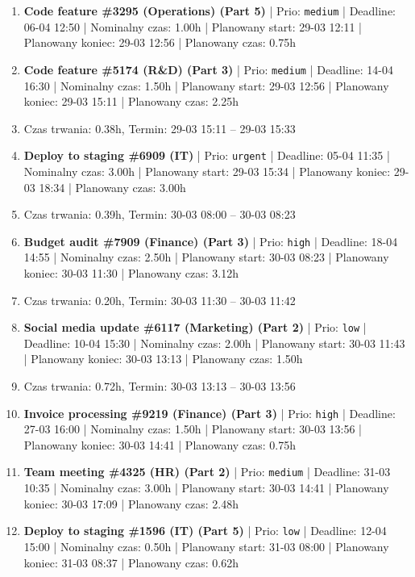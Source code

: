 {\begin{enumerate}
  \item [\textbf{14645}] \textbf{Code feature \#3295 (Operations) (Part 5)} | Prio: \texttt{medium} | Deadline: 06-04 12:50 | Nominalny czas: 1.00h | Planowany start: 29-03 12:11 | Planowany koniec: 29-03 12:56 | Planowany czas: 0.75h
  \item [\textbf{14646}] \textbf{Code feature \#5174 (R\&D) (Part 3)} | Prio: \texttt{medium} | Deadline: 14-04 16:30 | Nominalny czas: 1.50h | Planowany start: 29-03 12:56 | Planowany koniec: 29-03 15:11 | Planowany czas: 2.25h
  \item [\textbf{PRZERWA}] Czas trwania: 0.38h, Termin: 29-03 15:11 -- 29-03 15:33
  \item [\textbf{14597}] \textbf{Deploy to staging \#6909 (IT)} | Prio: \texttt{urgent} | Deadline: 05-04 11:35 | Nominalny czas: 3.00h | Planowany start: 29-03 15:34 | Planowany koniec: 29-03 18:34 | Planowany czas: 3.00h
  \item [\textbf{PRZERWA}] Czas trwania: 0.39h, Termin: 30-03 08:00 -- 30-03 08:23
  \item [\textbf{14616}] \textbf{Budget audit \#7909 (Finance) (Part 3)} | Prio: \texttt{high} | Deadline: 18-04 14:55 | Nominalny czas: 2.50h | Planowany start: 30-03 08:23 | Planowany koniec: 30-03 11:30 | Planowany czas: 3.12h
  \item [\textbf{PRZERWA}] Czas trwania: 0.20h, Termin: 30-03 11:30 -- 30-03 11:42
  \item [\textbf{14700}] \textbf{Social media update \#6117 (Marketing) (Part 2)} | Prio: \texttt{low} | Deadline: 10-04 15:30 | Nominalny czas: 2.00h | Planowany start: 30-03 11:43 | Planowany koniec: 30-03 13:13 | Planowany czas: 1.50h
  \item [\textbf{PRZERWA}] Czas trwania: 0.72h, Termin: 30-03 13:13 -- 30-03 13:56
  \item [\textbf{14622}] \textbf{Invoice processing \#9219 (Finance) (Part 3)} | Prio: \texttt{high} | Deadline: 27-03 16:00 | Nominalny czas: 1.50h | Planowany start: 30-03 13:56 | Planowany koniec: 30-03 14:41 | Planowany czas: 0.75h
  \item [\textbf{14641}] \textbf{Team meeting \#4325 (HR) (Part 2)} | Prio: \texttt{medium} | Deadline: 31-03 10:35 | Nominalny czas: 3.00h | Planowany start: 30-03 14:41 | Planowany koniec: 30-03 17:09 | Planowany czas: 2.48h
  \item [\textbf{14692}] \textbf{Deploy to staging \#1596 (IT) (Part 5)} | Prio: \texttt{low} | Deadline: 12-04 15:00 | Nominalny czas: 0.50h | Planowany start: 31-03 08:00 | Planowany koniec: 31-03 08:37 | Planowany czas: 0.62h

\end{enumerate}}
